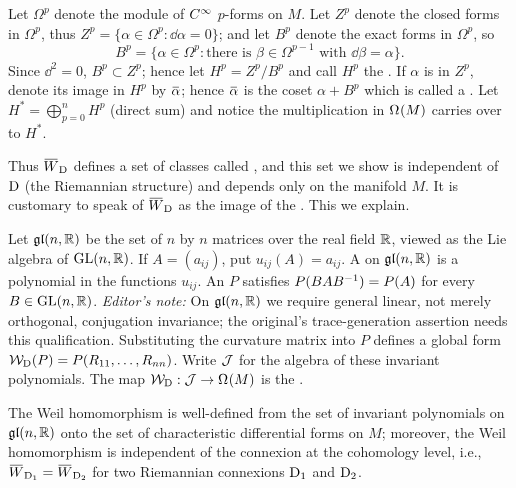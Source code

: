 \documentclass[../main]{subfiles}
\begin{document}
Let $\Omega^p$ denote the module of $C^\infty$ $p$-forms on $M$. Let $Z^p$ denote the closed forms in $\Omega^p$, thus $Z^p=\{\alpha\in \Omega^p:\dd \alpha=0\}$; and let $B^p$ denote the exact forms in $\Omega^p$, so \[B^p=\{\alpha\in \Omega^p:\text{there is }\beta\in \Omega^{p-1}\text{ with }\dd\beta=\alpha\}.\] Since $\dd^2=0$, $B^p \subset Z^p$; hence let $H^p=Z^p/B^p$ and call $H^p$ the . If $\alpha$ is in $Z^p$, denote its image in $H^p$ by $\xoverline{\alpha}$; hence $\xoverline{\alpha}$ is the coset $\alpha+B^p$ which is called a . Let $H^*=\bigoplus_{p=0}^nH^p$ (direct sum) and notice the multiplication in $\Omega^{}(M)$ carries over to $H^*$.

Thus $\xoverline{W}_\connection$ defines a set of classes called , and this set we show is independent of $\mathrm{D}$ (the Riemannian structure) and depends only on the manifold $M$. It is customary to speak of $\xoverline{W}_\connection$ as the image of the . This we explain.

Let $\mathfrak{gl}(n,\mathbb{R})$ be the set of $n$ by $n$ matrices over the real field $\mathbb{R}$, viewed as the Lie algebra of $\mathrm{GL}(n,\mathbb{R})$. If $A=(a_{ij})$, put $u_{ij}(A)=a_{ij}$. A  on $\mathfrak{gl}(n,\mathbb{R})$ is a polynomial in the functions $u_{ij}$. An  $P$ satisfies $P(BAB^{-1})=P(A)$ for every $B\in\mathrm{GL}(n,\mathbb{R})$. \emph{Editor's note:} On $\mathfrak{gl}(n,\mathbb{R})$ we require general linear, not merely orthogonal, conjugation invariance; the original's trace-generation assertion needs this qualification. Substituting the curvature matrix into $P$ defines a global form ${\cal W}_{\mathrm{D}}(P)=P(R_{11},\dots,R_{nn})$. Write ${\cal J}$ for the algebra of these invariant polynomials. The map ${\cal W}_{\mathrm{D}}:{\cal J}\to\Omega^{}(M)$ is the .



\begin{theorem} \label{thm:ch8.4.2}
The Weil homomorphism is well-defined from the set of invariant polynomials on $\mathfrak{gl}(n,\mathbb{R})$ onto the set of characteristic differential forms on $M$; moreover, the Weil homomorphism is independent of the connexion at the cohomology level, i.e., $\xoverline{W}_{\connection_1}=\xoverline{W}_{\connection_2}$ for two Riemannian connexions $\mathrm{D}_1$ and $\mathrm{D}_2$.
\end{theorem}
\end{document}
